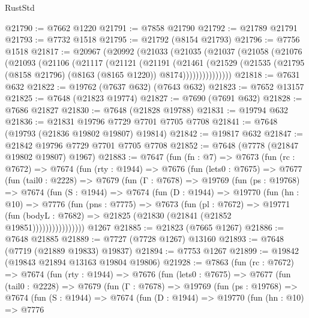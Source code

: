 \begin{lexlean}{RustStd}
\begin{coremodule}
{\begin{coremodule}
{{{{{{{{{{{{{{{{{{{{{{{{{{{{{{{{{{{{{{{{{{{{{{{{{{{{{@21790 := @7662 @1220
@21791 := @7858 @21790
@21792 := @21789 @21791
@21793 := @7732 @1518
@21795 := @21792 (@8154 @21793)
@21796 := @7756 @1518
@21817 := @20967
    (@20992
      (@21033
        (@21035
          (@21037
            (@21058
              (@21076
                (@21093
                  (@21106
                    (@21117
                      (@21121
                        (@21191
                          (@21461
                            (@21529
                              (@21535
                                (@21795 (@8158 @21796) (@8163 (@8165 @1220)) @8174)))))))))))))))
@21818 := @7631 @632
@21822 := @19762 (@7637 @632) (@7643 @632)
@21823 := @7652 @13157
@21825 := @7648 (@21823 @19774)
@21827 := @7690 (@7691 @632)
@21828 := @7686 @21827
@21830 := @7648 (@21828 @19788)
@21831 := @19794 @632
@21836 := @21831 @19796 @7729 @7701 @7705 @7708
@21841 := @7648 (@19793 (@21836 @19802 @19807) @19814)
@21842 := @19817 @632
@21847 := @21842 @19796 @7729 @7701 @7705 @7708
@21852 := @7648 (@7778 (@21847 @19802 @19807) @1967)
@21883 := @7647
    (fun (fn : @7) =>
    @7673
      (fun (rc : @7672) =>
      @7674
        (fun (rty : @1944) =>
        @7676
          (fun (lets0 : @7675) =>
          @7677
            (fun (tail0 : @2228) =>
            @7679
              (fun (Γ : @7678) =>
              @19769
                (fun (ps : @19768) =>
                @7674
                  (fun (S : @1944) =>
                  @7674
                    (fun (D : @1944) =>
                    @19770
                      (fun (hn : @10) =>
                      @7776
                        (fun (pns : @7775) =>
                        @7673
                          (fun (pl : @7672) =>
                          @19771
                            (fun (bodyL : @7682) =>
                            @21825 (@21830 (@21841 (@21852 @19851))))))))))))))))
    @1267
@21885 := @21823 (@7665 @1267)
@21886 := @7648 @21885
@21889 := @7727 (@7728 @1267) @13160
@21893 := @7648 (@7719 (@21889 @19833) @19837)
@21894 := @7753 @1267
@21899 := @19842 (@19843 @21894 @13163 @19804 @19806)
@21928 := @7863
    (fun (rc : @7672) =>
    @7674
      (fun (rty : @1944) =>
      @7676
        (fun (lets0 : @7675) =>
        @7677
          (fun (tail0 : @2228) =>
          @7679
            (fun (Γ : @7678) =>
            @19769
              (fun (ps : @19768) =>
              @7674
                (fun (S : @1944) =>
                @7674
                  (fun (D : @1944) =>
                  @19770
                    (fun (hn : @10) =>
                    @7776
}}}}}}}}}}}}}}}}}}}}}}}}}}}}}}}}}}}}}}}}}}}}}}}}}}}}}
\end{coremodule}}
\end{coremodule}
\end{lexlean}
